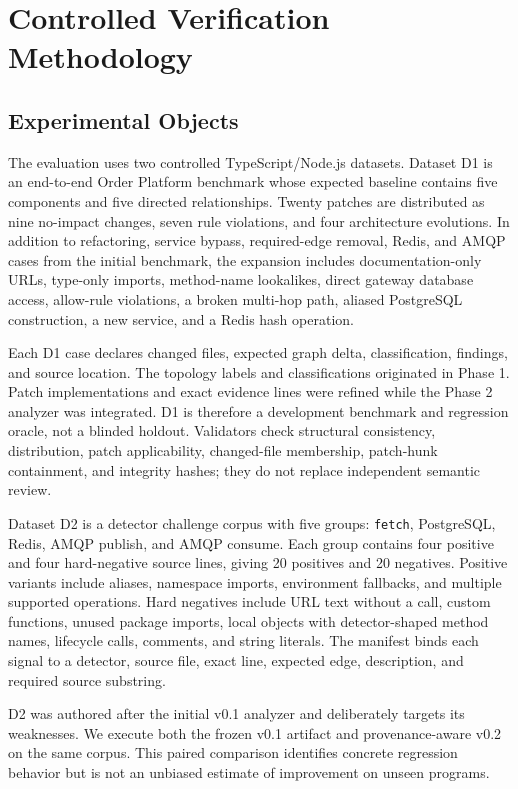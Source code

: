 \section{Controlled Verification Methodology}

\subsection{Experimental Objects}

The evaluation uses two controlled TypeScript/Node.js datasets. Dataset D1 is an end-to-end Order Platform benchmark whose expected baseline contains five components and five directed relationships. Twenty patches are distributed as nine no-impact changes, seven rule violations, and four architecture evolutions. In addition to refactoring, service bypass, required-edge removal, Redis, and AMQP cases from the initial benchmark, the expansion includes documentation-only URLs, type-only imports, method-name lookalikes, direct gateway database access, allow-rule violations, a broken multi-hop path, aliased PostgreSQL construction, a new service, and a Redis hash operation.

Each D1 case declares changed files, expected graph delta, classification, findings, and source location. The topology labels and classifications originated in Phase 1. Patch implementations and exact evidence lines were refined while the Phase 2 analyzer was integrated. D1 is therefore a development benchmark and regression oracle, not a blinded holdout. Validators check structural consistency, distribution, patch applicability, changed-file membership, patch-hunk containment, and integrity hashes; they do not replace independent semantic review.

Dataset D2 is a detector challenge corpus with five groups: \texttt{fetch}, PostgreSQL, Redis, AMQP publish, and AMQP consume. Each group contains four positive and four hard-negative source lines, giving 20 positives and 20 negatives. Positive variants include aliases, namespace imports, environment fallbacks, and multiple supported operations. Hard negatives include URL text without a call, custom functions, unused package imports, local objects with detector-shaped method names, lifecycle calls, comments, and string literals. The manifest binds each signal to a detector, source file, exact line, expected edge, description, and required source substring.

D2 was authored after the initial v0.1 analyzer and deliberately targets its weaknesses. We execute both the frozen v0.1 artifact and provenance-aware v0.2 on the same corpus. This paired comparison identifies concrete regression behavior but is not an unbiased estimate of improvement on unseen programs.

